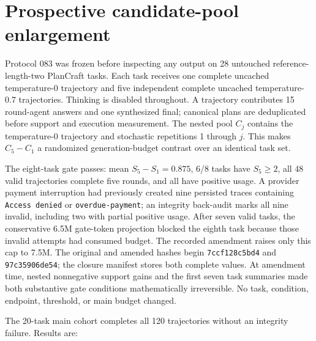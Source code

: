 \section{Prospective candidate-pool enlargement}

Protocol 083 was frozen before inspecting any output on 28 untouched reference-length-two PlanCraft tasks. Each task receives one complete uncached temperature-0 trajectory and five independent complete uncached temperature-0.7 trajectories. Thinking is disabled throughout. A trajectory contributes 15 round-agent answers and one synthesized final; canonical plans are deduplicated before support and execution measurement. The nested pool \(C_j\) contains the temperature-0 trajectory and stochastic repetitions 1 through \(j\). This makes \(C_5-C_1\) a randomized generation-budget contrast over an identical task set.

The eight-task gate passes: mean \(S_5-S_1=0.875\), 6/8 tasks have \(S_5\ge2\), all 48 valid trajectories complete five rounds, and all have positive usage. A provider payment interruption had previously created nine persisted traces containing \texttt{Access denied} or \texttt{overdue-payment}; an integrity back-audit marks all nine invalid, including two with partial positive usage. After seven valid tasks, the conservative 6.5M gate-token projection blocked the eighth task because those invalid attempts had consumed budget. The recorded amendment raises only this cap to 7.5M. The original and amended hashes begin \texttt{7ccf128c5bd4} and \texttt{97c35906de54}; the closure manifest stores both complete values. At amendment time, nested nonnegative support gains and the first seven task summaries made both substantive gate conditions mathematically irreversible. No task, condition, endpoint, threshold, or main budget changed.

The 20-task main cohort completes all 120 trajectories without an integrity failure. Results are:

\begin{center}
\end{center}

